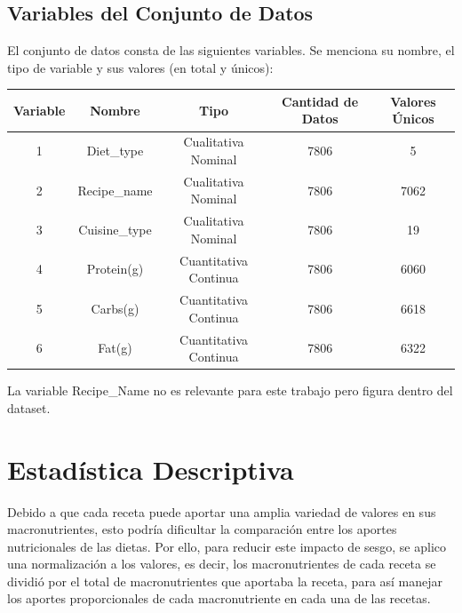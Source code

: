 \documentclass[12pt,a4paper]{article}
\begin{document}
    \subsection{Variables del Conjunto de Datos}
    El conjunto de datos consta de las siguientes variables. Se menciona su 
    nombre, el tipo de variable y sus valores (en total y únicos):
    \begin{center}
        \begin{tabular}{|c|c|c|c|c|}
            \hline
            Variable & Nombre & Tipo & Cantidad de Datos & Valores Únicos\\
            \hline
            1 & Diet\_type & Cualitativa Nominal & 7806 & 5 \\
            2 & Recipe\_name & Cualitativa Nominal & 7806 & 7062\\
            3 & Cuisine\_type & Cualitativa Nominal & 7806 & 19\\
            4 & Protein(g) & Cuantitativa Continua & 7806 & 6060\\
            5 & Carbs(g) & Cuantitativa Continua & 7806 & 6618\\
            6 & Fat(g) & Cuantitativa Continua & 7806 & 6322\\
            \hline
        \end{tabular}
    \end{center}
    La variable Recipe\_Name no es relevante para este trabajo pero figura 
    dentro del dataset.

\newpage

\section{Estadística Descriptiva}
    Debido a que cada receta puede aportar una amplia variedad de valores 
    en sus macronutrientes, esto podría dificultar la comparación entre 
    los aportes nutricionales de las dietas. Por ello, para reducir este 
    impacto de sesgo, se aplico una normalización a los valores, es decir, 
    los macronutrientes de cada receta se dividió por el total de macronutrientes 
    que aportaba la receta, para así manejar los aportes proporcionales de 
    cada macronutriente en cada una de las recetas.
\end{document}
